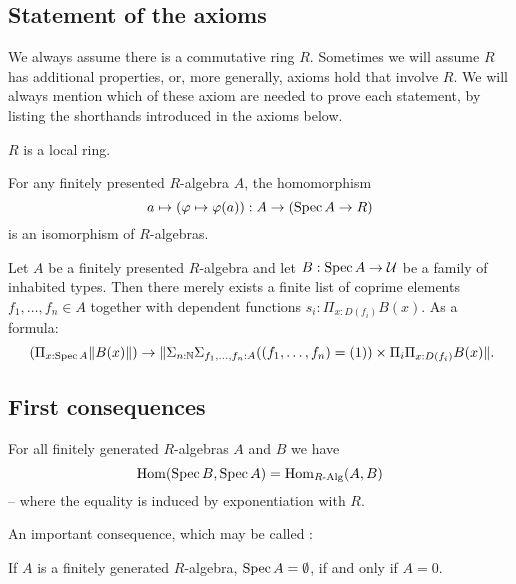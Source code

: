 \subsection{Statement of the axioms}
We always assume there is a commutative ring $R$.
Sometimes we will assume $R$ has additional properties, or, more generally,
axioms hold that involve $R$.
We will always mention which of these axiom are needed to prove each statement,
by listing the shorthands introduced in the axioms below.

\begin{axiom}[Loc]%
  \label{loc}
  $R$ is a local ring.
\end{axiom}

\begin{axiom}[SQC]%
  \label{sqc}
  For any finitely presented $R$-algebra $A$, the homomorphism
  \[ a \mapsto (\varphi\mapsto \varphi(a)) : A \to (\operatorname{Spec} A \to R)\]
  is an isomorphism of $R$-algebras.
\end{axiom}

\begin{axiom}[Z-choice]%
  \label{Z-choice}
  Let $A$ be a finitely presented $R$-algebra
  and let $B : \operatorname{Spec} A \to \mathcal{U}$ be a family of inhabited types.
  Then there merely exists
  a finite list of coprime elements $f_1, \dots, f_n \in A$
  together with dependent functions $s_i : \Pi_{x : D(f_i)} B(x)$.
  As a formula:
  \[ (\Pi_{x : \Spec A} \propTrunc{B(x)}) \to
     \propTrunc{ \Sigma_{n : \N} \Sigma_{f_1, \dots, f_n : A}
      ((f_1, \dots, f_n) = (1)) \times
      \Pi_i \Pi_{x : D(f_i)} B(x) }
     \rlap{.}
  \]
\end{axiom}

\subsection{First consequences}

\begin{proposition}%
  \label{spec-embedding}
  For all finitely generated $R$-algebras $A$ and $B$ we have
  \[ \mathrm{Hom}(\operatorname{Spec} B, \operatorname{Spec} A)=\mathrm{Hom}_{R\text{-}\mathrm{Alg}}(A,B)\]
  -- where the equality is induced by exponentiation with $R$.
\end{proposition}

An important consequence, which may be called :

\begin{proposition}%
  \label{weak-nullstellensatz}
  If $A$ is a finitely generated $R$-algebra, $\operatorname{Spec} A=\emptyset$, if and only if $A=0$.
\end{proposition}

